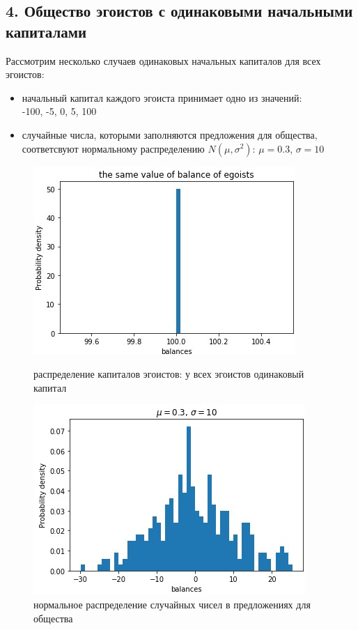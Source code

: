 \documentclass{article}
\begin{document}
\subsection*{4. Общество эгоистов с одинаковыми начальными \\ капиталами}
	Рассмотрим несколько случаев одинаковых начальных капиталов для всех эгоистов:
	\begin{itemize}
		\item начальный капитал каждого эгоиста принимает одно из значений:\\ -100, -5, 0, 5, 100
		\item случайные числа, которыми заполняются предложения для общества, соответсвуют нормальному распределению $N\left(\mu, {\sigma}^2 \right) $: $\mu = 0.3$, $\sigma = 10$
	\end{itemize}
\begin{figure}[H]
	\begin{minipage}[h]{0.49\linewidth}
		\includegraphics[width=1.0\linewidth]{assets/same_value_distribution_example.jpg}
		\caption{распределение капиталов \newline эгоистов: у всех эгоистов одинаковый капитал}
\end{minipage}
	\hfill
	\begin{minipage}[h]{0.49\linewidth}
		\includegraphics[width=1.0\linewidth]{assets/suggestion_distribution_example.jpg}
		\caption{нормальное распределение случайных чисел в предложениях для общества}
	\end{minipage}
\end{figure}
\end{document}
